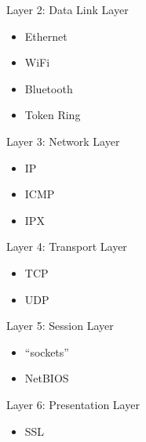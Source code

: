 \begin{frame}{Layer 2: Data Link Layer}
\protect\hypertarget{layer-2-data-link-layer}{}

\begin{itemize}
\tightlist
\item
  Ethernet
\item
  WiFi
\item
  Bluetooth
\item
  Token Ring
\end{itemize}

\end{frame}

\begin{frame}{Layer 3: Network Layer}
\protect\hypertarget{layer-3-network-layer}{}

\begin{itemize}
\tightlist
\item
  IP
\item
  ICMP
\item
  IPX
\end{itemize}

\end{frame}

\begin{frame}{Layer 4: Transport Layer}
\protect\hypertarget{layer-4-transport-layer}{}

\begin{itemize}
\tightlist
\item
  TCP
\item
  UDP
\end{itemize}

\end{frame}

\begin{frame}{Layer 5: Session Layer}
\protect\hypertarget{layer-5-session-layer}{}

\begin{itemize}
\tightlist
\item
  “sockets”
\item
  NetBIOS
\end{itemize}

\end{frame}

\begin{frame}{Layer 6: Presentation Layer}
\protect\hypertarget{layer-6-presentation-layer}{}

\begin{itemize}
\tightlist
\item
  SSL
\end{itemize}


\end{frame}

